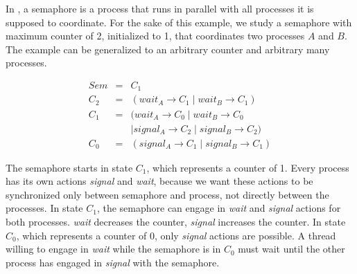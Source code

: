 In \CSP, a semaphore is a process that runs in parallel with all processes it is supposed to coordinate.
For the sake of this example, we study a semaphore with maximum counter of 2, initialized to 1, that coordinates two processes $A$ and $B$.
The example can be generalized to an arbitrary counter and arbitrary many processes.

\begin{equation*}
  \begin{array}{rcl}
  Sem & = & C_1 \\
  C_2 & = & (wait_A \to C_1 \mid wait_B \to C_1) \\
  C_1 & = & (wait_A \to C_0 \mid wait_B \to C_0 \\
      &   & \mid signal_A \to C_2 \mid signal_B \to C_2) \\
  C_0 & = & (signal_A \to C_1 \mid signal_B \to C_1)
  \end{array}
\end{equation*}

The semaphore starts in state $C_1$, which represents a counter of 1.
Every process has its own actions \emph{signal} and \emph{wait}, because we want these actions to be synchronized only between semaphore and process, not directly between the processes.
In state $C_1$, the semaphore can engage in \emph{wait} and \emph{signal} actions for both processes.
\emph{wait} decreases the counter, \emph{signal} increases the counter.
In state $C_0$, which represents a counter of 0, only \emph{signal} actions are possible.
A thread willing to engage in \emph{wait} while the semaphore is in $C_0$ must wait until the other process has engaged in \emph{signal} with the semaphore.


